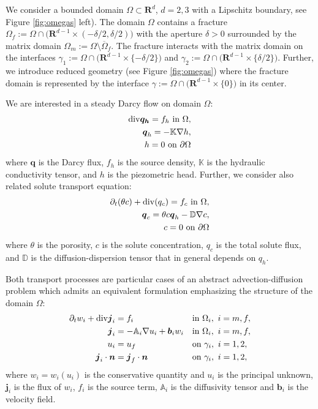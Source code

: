 \documentclass[a4paper]{article}
\def\prtl{\partial}
\def\vc#1{\mathbf{\boldsymbol{#1}}}     %
\def\tn#1{{\mathbb{#1}}}    %
\def\div{{\rm div}}
\def\grad{\nabla}
\def\Real{{\mathbf R}}
\begin{document}
We consider a bounded domain $\Omega \subset \Real^d$, $d=2,3$ with a Lipschitz boundary, see Figure \ref{fig:omegas} left). The domain $\Omega$ contains 
a fracture $\Omega_f:=\Omega\cap \big(\Real^{d-1}\times(-\delta/2,\delta/2)\big)$ 
with the aperture $\delta>0$ surrounded by the matrix domain $\Omega_m:=\Omega\setminus\overline\Omega_f$.  The fracture interacts with the matrix domain on the interfaces
$\gamma_1:=\Omega\cap\big( \Real^{d-1}\times \{-\delta/2\}\big)$ and $\gamma_2:=\Omega\cap \big( \Real^{d-1}\times \{\delta/2\}\big)$. Further, we introduce reduced geometry (see Figure \ref{fig:omegas})
where the fracture domain is represented by the interface $\gamma:=\Omega\cap\big(\Real^{d-1}\times\{0\}\big)$ in its center. 

We are interested in a steady Darcy flow on domain $\Omega$:
\begin{subequations}
\label{eq:darcy_flow}
\begin{align}
    \div \vc{q_h} = f_h \mbox{ in }\Omega, \\
    \vc q_h = -\tn K \grad h, \\
    h=0\mbox{ on }\partial\Omega
\end{align}
\end{subequations}
where $\vc q$ is the Darcy flux, $f_h$ is the source density, $\tn K$ is the hydraulic conductivity tensor, and $h$ is the piezometric head.
Further, we consider also related solute transport equation:
\begin{align}
    \label{eq:solute_transport}
    \prtl_t (\theta c) + \div(q_c) = f_c \mbox{ in }\Omega,\\
    \vc q_c = \theta c \vc q_h - \tn D \grad c, \\
    c=0\mbox{ on }\partial\Omega
\end{align}
where $\theta$ is the porosity, $c$ is the solute concentration, $q_c$ is the total solute flux, and $\tn D$ is the diffusion-dispersion tensor that in general depends on $q_h$.

Both transport processes are particular cases of an abstract advection-diffusion problem which admits an equivalent formulation
emphasizing the structure of the domain $\Omega$:
\begin{align}
  \label{eq:fr:continuity}
  \prtl_t w_i + \div \vc j_i &= f_i&&  \text{in } \Omega_i,\ i=m,f,\\
  \label{eq:fr:flux}
  \vc j_i &= - \tn A_i\grad u_i + \vc b_i w_i&& \text{in } \Omega_i,\ i=m,f,\\
  \label{eq:fr:Dirichlet}
  u_i &= u_f&& \text{on } \gamma_i,\ i=1,2,\\
  \label{eq:fr:Neumann}
  \vc j_i \cdot \vc n &= \vc j_f \cdot \vc n&& \text{on } \gamma_i,\ i=1,2,
\end{align}
where $w_i=w_i(u_i)$ is the conservative quantity and $u_i$ is the principal unknown, $\vc j_i$ is the flux of $w_i$, $f_i$ is the source term,
$\tn A_i$ is the diffusivity tensor and $\vc b_i$ is the velocity field. 
\end{document}
